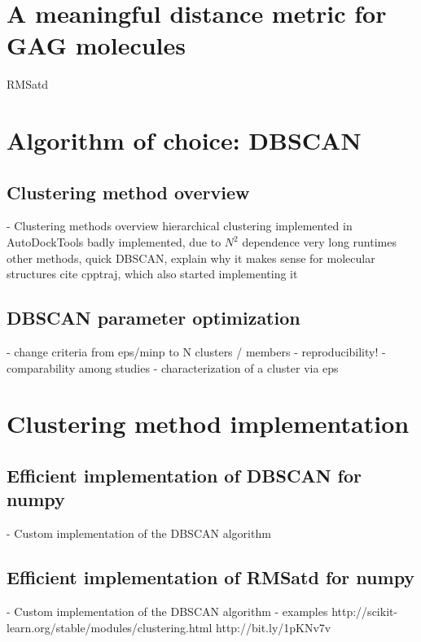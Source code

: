 \section{A meaningful distance metric for GAG molecules}
RMSatd


\section{Algorithm of choice: DBSCAN}

\subsection{Clustering method overview}

    - Clustering methods overview
        hierarchical clustering implemented in AutoDockTools
            badly implemented, due to $N^2$ dependence very long runtimes
        other methods, quick
        DBSCAN, explain why it makes sense for molecular structures
        cite cpptraj, which also started implementing it

\subsection{DBSCAN parameter optimization}

    - change criteria from eps/minp to N clusters / members
    - reproducibility!
    - comparability among studies
    - characterization of a cluster via eps


\section{Clustering method implementation}

\subsection{Efficient implementation of DBSCAN for numpy}

        - Custom implementation of the DBSCAN algorithm

\subsection{Efficient implementation of RMSatd for numpy}

        - Custom implementation of the DBSCAN algorithm
        - examples
            http://scikit-learn.org/stable/modules/clustering.html
            http://bit.ly/1pKNv7v


